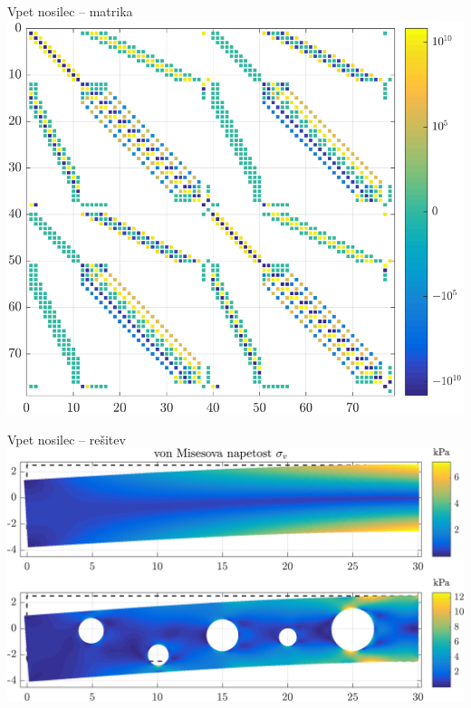 \begin{frame}{Vpet nosilec -- matrika}
  \centering
  \vspace{2ex}
  \includegraphics[height=0.8\textheight]{resources/cantilever_beam_matrix_example.pdf}
\end{frame}


\begin{frame}{Vpet nosilec -- rešitev}
  \centering
  \vspace{3ex}
  \includegraphics[width=\textwidth]{resources/cantilever_beam_with_holes.png}
\end{frame}

